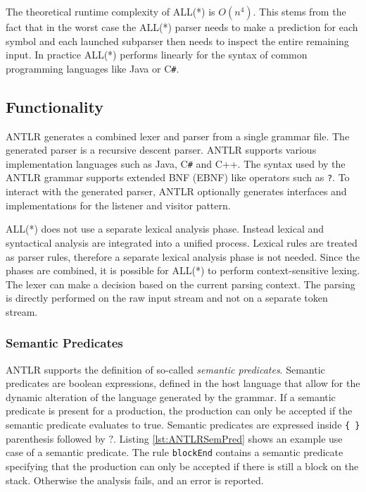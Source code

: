 The theoretical runtime complexity of ALL(*) is $O(n^4)$. This stems from the fact that in the worst case the ALL(*) parser needs to make a prediction for each symbol and each launched subparser then needs to inspect the entire remaining input. In practice ALL(*) performs linearly for the syntax of common programming languages like Java or C\verb|#|.


\subsection{Functionality}

ANTLR generates a combined lexer and parser from a single grammar file. The generated parser is a recursive descent parser. ANTLR supports various implementation languages such as Java, C\verb|#| and C++. The syntax used by the ANTLR grammar supports extended BNF (EBNF) like operators such as \texttt{?}. To interact with the generated parser, ANTLR optionally generates interfaces and implementations for the listener and visitor pattern.

ALL(*) does not use a separate lexical analysis phase. Instead lexical and syntactical analysis are integrated into a unified process. Lexical rules are treated as parser rules, therefore a separate lexical analysis phase is not needed. Since the phases are combined, it is possible for ALL(*) to perform context-sensitive lexing. The lexer can make a decision based on the current parsing context. The parsing is directly performed on the raw input stream and not on a separate token stream. 

\subsubsection{Semantic Predicates}

ANTLR supports the definition of so-called \textit{semantic predicates}. Semantic predicates are boolean expressions, defined in the host language that allow for the dynamic alteration of the language generated by the grammar. If a semantic predicate is present for a production, the production can only be accepted if the semantic predicate evaluates to true. Semantic predicates are expressed inside \verb|{ }| parenthesis followed by $?$. Listing \ref{lst:ANTLRSemPred} shows an example use case of a semantic predicate. The rule \texttt{blockEnd} contains a semantic predicate specifying that the production can only be accepted if there is still a block on the stack. Otherwise the analysis fails, and an error is reported.

